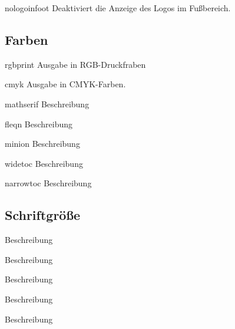 \documentclass[a4paper,colorscheme=green,TUBStitlepage=picture]{tubsreprt}
\begin{document}
\begin{classoption}{nologoinfoot}
  Deaktiviert die Anzeige des Logos im Fußbereich.
\end{classoption}

\subsection{Farben}

\begin{classoption}{rgbprint}
  Ausgabe in RGB-Druckfraben
\end{classoption}

\begin{classoption}{cmyk}
  Ausgabe in CMYK-Farben.
\end{classoption}


\begin{classoption}{mathserif}
  Beschreibung
\end{classoption}

\begin{classoption}{fleqn}
  Beschreibung
\end{classoption}

\begin{classoption}{minion}
  Beschreibung
\end{classoption}

\begin{classoption}{widetoc}
  Beschreibung
\end{classoption}

\begin{classoption}{narrowtoc}
  Beschreibung
\end{classoption}

\subsection{Schriftgröße}

\begin{classoption}{9pt}
  Beschreibung
\end{classoption}

\begin{classoption}{10pt}
  Beschreibung
\end{classoption}

\begin{classoption}{11pt}
  Beschreibung
\end{classoption}

\begin{classoption}{12pt}
  Beschreibung
\end{classoption}

\begin{classoption}{14pt}
  Beschreibung
\end{classoption}
\end{document}
